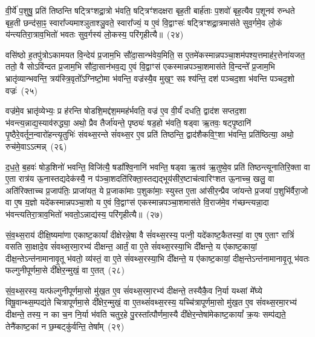 वी॒र्ये॑ प॒शुषु॒ प्रति॑ तिष्ठन्ति षट्त्रिꣳशद्रा॒त्रो भ॑वति॒ षट्त्रिꣳ॑शदक्षरा बृह॒ती बार्\mbox{}ह॑ताः प॒शवो॑ बृह॒त्यैव प॒शूनव॑ रुन्धते बृह॒ती छन्द॑सा॒ꣴ॒ स्वारा᳚ज्यमाश्ञुताश्ञु॒वते॒ स्वारा᳚ज्यं॒ य ए॒वं वि॒द्वाꣳसः॑ षट्त्रिꣳशद्रा॒त्रमास॑ते सुव॒र्गमे॒व लो॒कं य॑न्त्यतिरा॒त्राव॒भितो॑ भवतः सुव॒र्गस्य॑ लो॒कस्य॒ परि॑गृहीत्यै॥~(२४)

{\anuvakamend[{अ॒ति॒रा॒त्र ओज॑स्ये॒व षट्त्रिꣳ॑शच्च}]}%

वसि॑ष्ठो ह॒तपु॑त्रो\-ऽकामयत वि॒न्देय॑ प्र॒जाम॒भि सौ॑दा॒सान्भ॑वेय॒मिति॒ स ए॒तमे॑कस्मान्नपञ्चा॒शम॑पश्य॒त्तमाह॑र॒त्तेना॑यजत॒ ततो॒ वै सो\-ऽवि॑न्दत प्र॒जाम॒भि सौ॑दा॒सान॑भव॒द्य ए॒वं वि॒द्वाꣳस॑ एकस्मान्नपञ्चा॒शमास॑ते वि॒न्दन्ते᳚ प्र॒जाम॒भि भ्रातृ॑व्यान्भवन्ति॒ त्रय॑स्त्रि॒वृतो᳚\-ऽग्निष्टो॒मा भ॑वन्ति॒ वज्र॑स्यै॒व मुख॒ꣳ॒ सꣴ श्य॑न्ति॒ दश॑ पञ्चद॒शा भ॑वन्ति पञ्चद॒शो वज्रः॑~(२५)

वज्र॑मे॒व भ्रातृ॑व्येभ्यः॒ प्र ह॑रन्ति षोडशि॒मद्द॑श॒ममह॑र्भवति॒ वज्र॑ ए॒व वी॒र्यं॑ दधति॒ द्वाद॑श सप्तद॒शा भ॑वन्त्य॒न्नाद्य॒स्याव॑रुद्ध्या॒ अथो॒ प्रैव तैर्जा॑यन्ते॒ पृष्ठ्यः॑ षड॒हो भ॑वति॒ षड्वा ऋ॒तवः॒ षट्पृ॒ष्ठानि॑ पृ॒ष्ठैरे॒वर्तून॒न्वारो॑हन्त्यृ॒तुभिः॑ संवथ्स॒रन्ते सं॑वथ्स॒र ए॒व प्रति॑ तिष्ठन्ति॒ द्वाद॑शैकवि॒ꣳ॒शा भ॑वन्ति॒ प्रति॑ष्ठित्या॒ अथो॒ रुच॑मे॒वा\-ऽऽ\-त्मन्न्~(२६)

द॒ध॒ते॒ ब॒हवः॑ षोड॒शिनो॑ भवन्ति॒ विजि॑त्यै॒ षडा᳚श्वि॒नानि॑ भवन्ति॒ षड्वा ऋ॒तव॑ ऋ॒तुष्वे॒व प्रति॑ तिष्ठन्त्यूनातिरि॒क्ता वा ए॒ता रात्र॑य ऊ॒नास्तद्यदेक॑स्यै॒ न प॑ञ्चा॒शदति॑रिक्ता॒स्तद्यद्भूय॑सीर॒ष्टाच॑त्वारिꣳशत ऊ॒नाच्च॒ खलु॒ वा अति॑रिक्ताच्च प्र॒जा\-प॑तिः॒ प्राजा॑यत॒ ये प्र॒जाका॑माः प॒शुका॑माः॒ स्युस्त ए॒ता आ॑सीर॒न्प्रैव जा॑यन्ते प्र॒जया॑ प॒शुभि॑र्वैरा॒जो वा ए॒ष य॒ज्ञो यदे॑कस्मान्नपञ्चा॒शो य ए॒वं वि॒द्वाꣳस॑ एकस्मान्नपञ्चा॒शमास॑ते वि॒राज॑मे॒व ग॑च्छन्त्यन्ना॒दा भ॑वन्त्यतिरा॒त्राव॒भितो॑ भवतो॒\-ऽन्नाद्य॑स्य॒ परि॑गृहीत्यै॥~(२७)

{\anuvakamend[{वज्र॑ आ॒त्मन्प्र॒जया॒ द्वाविꣳ॑शतिश्च}]}%

सं॒व॒थ्स॒राय॑ दीक्षि॒ष्यमा॑णा एकाष्ट॒कायां᳚ दीक्षेरन्ने॒षा वै सं॑वथ्स॒रस्य॒ पत्नी॒ यदे॑काष्ट॒कैतस्यां॒ वा ए॒ष ए॒ताꣳ रात्रिं॑ वसति सा॒क्षादे॒व सं॑वथ्स॒रमा॒रभ्य॑ दीक्षन्त॒ आर्तं॒ वा ए॒ते सं॑वथ्स॒रस्या॒भि दी᳚क्षन्ते॒ य ए॑काष्ट॒कायां॒ दीक्ष॒न्ते\-ऽन्त॑नामानावृ॒तू भ॑वतो॒ व्य॑स्तं॒ वा ए॒ते सं॑वथ्स॒रस्या॒भि दी᳚क्षन्ते॒ य ए॑काष्ट॒कायां॒ दीक्ष॒न्ते\-ऽन्त॑नामानावृ॒तू भ॑वतः फल्गुनीपूर्णमा॒से दी᳚क्षेर॒न्मुखं॒ वा ए॒तत्~(२८)

सं॒व॒थ्स॒रस्य॒ यत्फ॑ल्गुनीपूर्णमा॒सो मु॑ख॒त ए॒व सं॑वथ्स॒रमा॒रभ्य॑ दीक्षन्ते॒ तस्यैकै॒व नि॒र्या यथ्सां मे᳚घ्ये विषू॒वान्थ्स॒म्पद्य॑ते चित्रापूर्णमा॒से दी᳚क्षेर॒न्मुखं॒ वा ए॒तथ्सं॑वथ्स॒रस्य॒ यच्चि॑त्रापूर्णमा॒सो मु॑ख॒त ए॒व सं॑वथ्स॒रमा॒रभ्य॑ दीक्षन्ते॒ तस्य॒ न का च॒न नि॒र्या भ॑वति चतुर॒हे पु॒रस्ता᳚त्पौर्णमा॒स्यै दी᳚क्षेर॒न्तेषा॑मेकाष्ट॒कायां᳚ क्र॒यः सम्प॑द्यते॒ तेनै॑काष्ट॒कां न छ॒म्बट्कु॑र्वन्ति॒ तेषा᳚म्~(२९)

